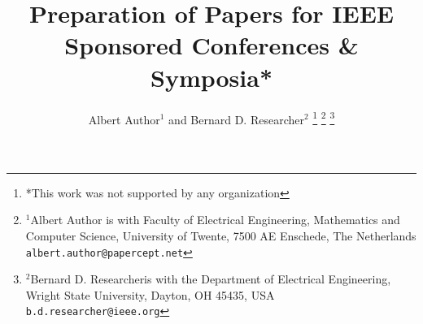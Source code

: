 \documentclass[letterpaper, 12pt, onecolumn, conference]{ieeeconf}  %
\title{\LARGE \bf
Preparation of Papers for IEEE Sponsored Conferences \& Symposia*
}
\author{Albert Author$^{1}$ and Bernard D. Researcher$^{2}$%
\thanks{*This work was not supported by any organization}%
\thanks{$^{1}$Albert Author is with Faculty of Electrical Engineering, Mathematics and Computer Science,
        University of Twente, 7500 AE Enschede, The Netherlands
        {\tt\small albert.author@papercept.net}}%
\thanks{$^{2}$Bernard D. Researcheris with the Department of Electrical Engineering, Wright State University,
        Dayton, OH 45435, USA
        {\tt\small b.d.researcher@ieee.org}}%
}
\begin{document}
\maketitle
\thispagestyle{empty}
\pagestyle{empty}

\begin{abstract}

\end{abstract}







\addtolength{\textheight}{-12cm}   %






\end{document}
